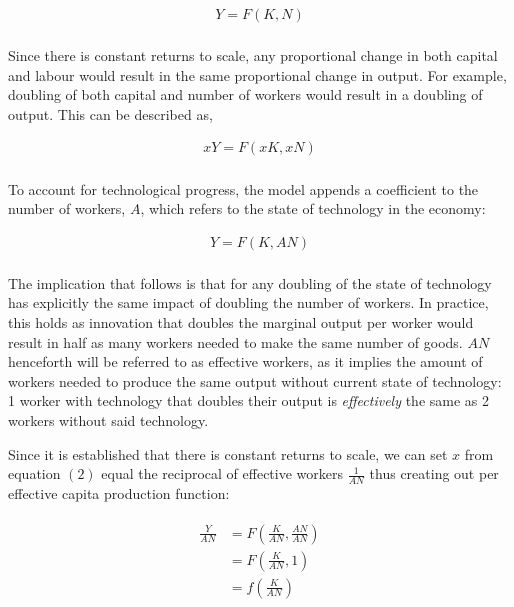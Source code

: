 \documentclass[
]{article}
\begin{document}
{\[\begin{matrix}
{Y = F(K,N)} \\
\end{matrix}\]}

Since there is constant returns to scale, any proportional change in
both capital and labour would result in the same proportional change in
output. For example, doubling of both capital and number of workers
would result in a doubling of output. This can be described as,

{\[\begin{matrix}
{xY = F(xK,xN)} \\
\end{matrix}\]}

To account for technological progress, the model appends a coefficient
to the number of workers, {\(A\)}, which refers to the state of
technology in the economy:

{\[\begin{matrix}
{Y = F(K,AN)} \\
\end{matrix}\]}

The implication that follows is that for any doubling of the state of
technology has explicitly the same impact of doubling the number of
workers. In practice, this holds as innovation that doubles the marginal
output per worker would result in half as many workers needed to make
the same number of goods. {\(AN\)} henceforth will be referred to as
effective workers, as it implies the amount of workers needed to produce
the same output without current state of technology: 1 worker with
technology that doubles their output is \emph{effectively} the same as 2
workers without said technology.

Since it is established that there is constant returns to scale, we can
set {\(x\)} from equation {\((2)\)} equal the reciprocal of effective
workers {\(\frac{1}{AN}\)} thus creating out per effective capita
production function:

\[\begin{matrix}
\begin{matrix}
\frac{Y}{AN} & {= F\left( \frac{K}{AN},\frac{AN}{AN} \right)} \\
 & {= F\left( \frac{K}{AN},1 \right)} \\
 & {= f\left( \frac{K}{AN} \right)} \\
\end{matrix} \\
\end{matrix}\]
\end{document}
